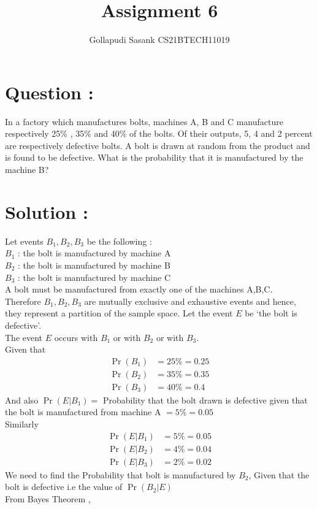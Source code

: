 \documentclass[journal,twocolumn]{IEEEtran}
\title{Assignment 6}
\author{Gollapudi Sasank CS21BTECH11019}
\providecommand{\pr}[1]{\ensuremath{\Pr\left(#1\right)}}
\begin{document}
\maketitle
\section*{Question : }
In a factory which manufactures bolts, machines A, B and C manufacture
respectively 25\% , 35\% and 40\% of the bolts. Of their outputs, 5, 4 and 2 percent are respectively defective bolts. A bolt is drawn at random from the product and is found to be defective. What is the probability that it is manufactured by the machine B?
\section*{Solution : }
Let  events $B_1,B_2,B_3$ be the following : \\
$B_1$ : the bolt is manufactured by machine A \\
$B_2$ : the bolt is manufactured by machine B \\
$B_3$ : the bolt is manufactured by machine C \\
A bolt must be manufactured from exactly one of the machines A,B,C.\\
Therefore $B_1,B_2,B_3$ are mutually exclusive and exhaustive events and hence, they represent a partition of the sample space.
Let the event $E$ be `the bolt is defective'.\\
The event $E$ occurs with $B_1$ or with $B_2$ or with $B_3$.\\
Given that 
\begin{align}
\pr{B_1} &= 25\% = 0.25 \\
\pr{B_2} &= 35\% = 0.35 \\
\pr{B_3} &= 40\% = 0.4 
\end{align} 
And also $\pr{E|B_1} = $ Probability that the bolt drawn is defective given that the bolt is manufactured from machine A $ = 5\% = 0.05 $ \\
Similarly
\begin{align}
\pr{E|B_1} &= 5\% = 0.05 \\
\pr{E|B_2} &= 4\% = 0.04 \\
\pr{E|B_3} &= 2\% = 0.02
\end{align}
We need to find the Probability that bolt is manufactured by $B_2$, Given that the bolt is defective i.e  the value of $\pr{B_2|E}$ \\
From Bayes Theorem , \\
\end{document}
